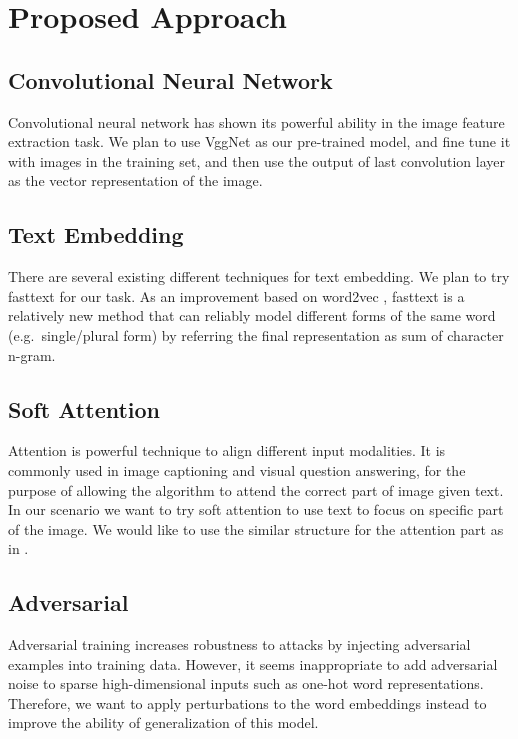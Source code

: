 \documentclass{article}
\begin{document}
\section{Proposed Approach}
\vspace{-3mm}
\subsection{Convolutional Neural Network}
\vspace{-3mm}
	Convolutional neural network has shown its powerful ability in the image feature extraction task. We plan to use VggNet \cite{Simonyan2014} as our pre-trained model, and fine tune it with images in the training set, and then use the output of last convolution layer as the vector representation of the image.
\vspace{-3mm}
\subsection{Text Embedding}
\vspace{-3mm}
	There are several existing different techniques for text embedding. We plan to try fasttext \cite{Bojanowski2016} for our task. As an improvement based on word2vec \cite{Mikolov2013}, fasttext is a relatively new method that can reliably model different forms of the same word (e.g.~single/plural form) by referring the final representation as sum of character n-gram.
\vspace{-3mm}
\subsection{Soft Attention}
\vspace{-3mm}
	Attention is powerful technique to align different input modalities. It is commonly used in image captioning and visual question answering, for the purpose of allowing the algorithm to attend the correct part of image given text. In our scenario we want to try soft attention to use text to focus on specific part of the image. We would like to use the similar structure for the attention part as in \cite{You2016}.
\vspace{-3mm}
\subsection{Adversarial}
\vspace{-3mm}
	Adversarial training increases robustness to attacks by injecting adversarial examples into training data. However, it seems inappropriate to add adversarial noise to sparse high-dimensional inputs such as one-hot word representations. Therefore, we want to apply perturbations to the word embeddings instead to improve the ability of generalization of this model.
\end{document}
